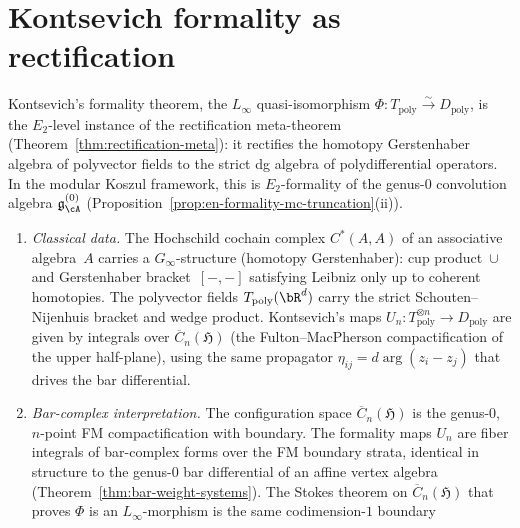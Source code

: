 \section{Kontsevich formality as rectification}
\label{sec:kontsevich-formality-rectification}

\begin{construction}
\label{constr:kontsevich-rectification}
Kontsevich's formality theorem, the $L_\infty$
quasi-isomorphism
$\Phi \colon T_{\mathrm{poly}} \xrightarrow{\sim}
D_{\mathrm{poly}}$, is the $E_2$-level instance of the
rectification meta-theorem
(Theorem~\ref{thm:rectification-meta}): it rectifies the
homotopy Gerstenhaber algebra of polyvector fields to the
strict dg algebra of polydifferential operators. In the
modular Koszul framework, this is $E_2$-formality of the
genus-$0$ convolution algebra $\mathfrak{g}^{(0)}_\cA$
(Proposition~\ref{prop:en-formality-mc-truncation}\textup{(ii)}).
\begin{enumerate}[label=\textup{(\roman*)}]
\item \emph{Classical data.}
 The Hochschild cochain complex $C^*(A,A)$ of an associative
 algebra~$A$ carries a $G_\infty$-structure (homotopy
 Gerstenhaber): cup product~$\cup$ and Gerstenhaber
 bracket~$[-,-]$ satisfying Leibniz only up to coherent
 homotopies. The polyvector fields $T_{\mathrm{poly}}(\bR^d)$
 carry the strict Schouten--Nijenhuis bracket and wedge product.
 Kontsevich's maps $U_n \colon T_{\mathrm{poly}}^{\otimes n}
 \to D_{\mathrm{poly}}$ are given by integrals over
 $\overline{C}_n(\mathfrak{H})$ (the Fulton--MacPherson
 compactification of the upper half-plane), using the same
 propagator $\eta_{ij} = d\arg(z_i - z_j)$ that drives the bar
 differential.
\item \emph{Bar-complex interpretation.}
 The configuration space
 $\overline{C}_n(\mathfrak{H})$ is the genus-$0$, $n$-point FM
 compactification with boundary. The formality maps $U_n$ are
 fiber integrals of bar-complex forms over the FM boundary
 strata, identical in structure to the genus-$0$ bar differential
 of an affine vertex algebra
 (Theorem~\ref{thm:bar-weight-systems}). The Stokes theorem on
 $\overline{C}_n(\mathfrak{H})$ that proves $\Phi$ is an
 $L_\infty$-morphism is the same codimension-$1$ boundary

\end{enumerate}
\end{construction}
